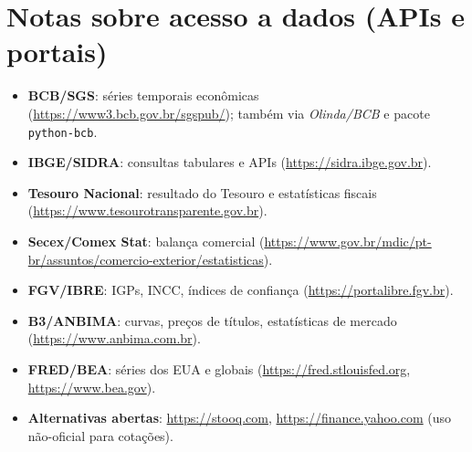 \documentclass[11pt,a4paper]{article}
\begin{document}
\bigskip
\section*{Notas sobre acesso a dados (APIs e portais)}
\begin{itemize}
  \item \textbf{BCB/SGS}: séries temporais econômicas (\url{https://www3.bcb.gov.br/sgspub/}); também via \emph{Olinda/BCB} e pacote \texttt{python-bcb}.
  \item \textbf{IBGE/SIDRA}: consultas tabulares e APIs (\url{https://sidra.ibge.gov.br}).
  \item \textbf{Tesouro Nacional}: resultado do Tesouro e estatísticas fiscais (\url{https://www.tesourotransparente.gov.br}).
  \item \textbf{Secex/Comex Stat}: balança comercial (\url{https://www.gov.br/mdic/pt-br/assuntos/comercio-exterior/estatisticas}).
  \item \textbf{FGV/IBRE}: IGPs, INCC, índices de confiança (\url{https://portalibre.fgv.br}).
  \item \textbf{B3/ANBIMA}: curvas, preços de títulos, estatísticas de mercado (\url{https://www.anbima.com.br}).
  \item \textbf{FRED/BEA}: séries dos EUA e globais (\url{https://fred.stlouisfed.org}, \url{https://www.bea.gov}).
  \item \textbf{Alternativas abertas}: \url{https://stooq.com}, \url{https://finance.yahoo.com} (uso não-oficial para cotações).
\end{itemize}

\clearpage
\appendix
\end{document}
